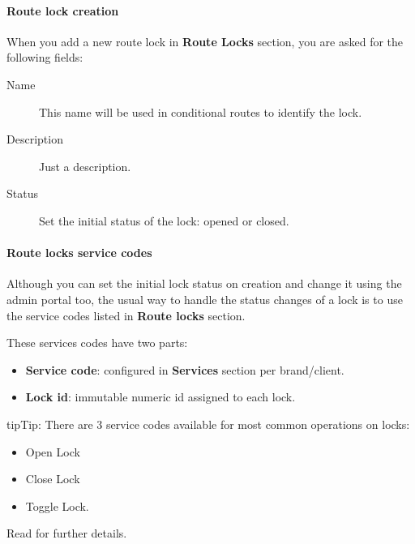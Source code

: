 \documentclass[letterpaper,10pt,english]{sphinxmanual}
\begin{document}
\paragraph{Route lock creation}
\label{administration_portal/client/vpbx/routing_tools/route_locks:route-lock-creation}
When you add a new route lock in \textbf{Route Locks} section, you are asked for the following fields:
\begin{description}
\item[{Name}] \leavevmode{}\label{administration_portal/client/vpbx/routing_tools/route_locks:term-name}
This name will be used in conditional routes to identify the lock.

\item[{Description}] \leavevmode{}\label{administration_portal/client/vpbx/routing_tools/route_locks:term-description}
Just a description.

\item[{Status}] \leavevmode{}\label{administration_portal/client/vpbx/routing_tools/route_locks:term-status}
Set the initial status of the lock: opened or closed.

\end{description}


\paragraph{Route locks service codes}
\label{administration_portal/client/vpbx/routing_tools/route_locks:route-locks-service-codes}
Although you can set the initial lock status on creation and change it using the admin portal too, the usual way to
handle the status changes of a lock is to use the service codes listed in \textbf{Route locks} section.

These services codes have two parts:
\begin{itemize}
\item {} 
\textbf{Service code}: configured in \textbf{Services} section per brand/client.

\item {} 
\textbf{Lock id}: immutable numeric id assigned to each lock.

\end{itemize}

\begin{notice}{tip}{Tip:}
There are 3 service codes available for most common operations on locks:
\begin{itemize}
\item {} 
Open Lock

\item {} 
Close Lock

\item {} 
Toggle Lock.

\end{itemize}

Read {\hyperref[administration_portal/platform/services:services]{}} for further details.
\end{notice}
\end{document}
